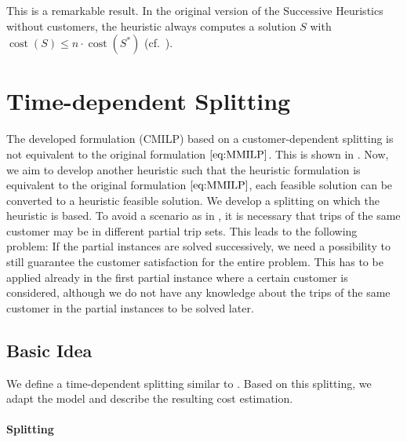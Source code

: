 This is a remarkable result. In the original version of the Successive Heuristics without customers, the heuristic always computes a solution $S$ with ${\operatorname{cost}\left(S\right)\leq n\cdot\operatorname{cost}\left(S^*\right)}$ (cf.~\cite[p.~130]{Knoll}).


\section{Time-dependent Splitting}
\label{sec:time_dependent_splitting}

The developed formulation (CMILP) based on a customer-dependent splitting is not equivalent to the original formulation $\eqref{eq:MMILP}$. This is shown in . Now, we aim to develop another heuristic such that the heuristic formulation is equivalent to the original formulation $\eqref{eq:MMILP}$, \ie each feasible solution can be converted to a heuristic feasible solution. We develop a splitting on which the heuristic is based. To avoid a scenario as in , it is necessary that trips of the same customer may be in different partial trip sets. This leads to the following problem: If the partial instances are solved successively, we need a possibility to still guarantee the customer satisfaction for the entire problem. This has to be applied already in the first partial instance where a certain customer is considered, although we do not have any knowledge about the trips of the same customer in the partial instances to be solved later.

\subsection{Basic Idea}
\label{sec:basic_idea}

We define a time-dependent splitting similar to \cite{Knoll}. Based on this splitting, we adapt the model and describe the resulting cost estimation.

\paragraph{Splitting} \parfill

